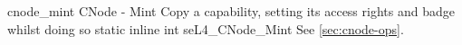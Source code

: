 %
%
%
%

\apidoc
{cnode_mint}
{CNode - Mint}
{Copy a capability, setting its access rights and badge whilst doing so}
{static inline int seL4\_CNode\_Mint}
{
}
{\errorenumdesc}
{See \autoref{sec:cnode-ops}.}

